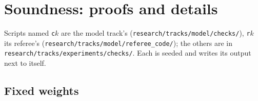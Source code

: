 \section{Soundness: proofs and details}\label{app:sound}

Scripts named \texttt{c}$k$ are the model track's (\nolinkurl{research/tracks/model/checks/}), \texttt{r}$k$ its referee's (\nolinkurl{research/tracks/model/referee_code/}); the others are in \nolinkurl{research/tracks/experiments/checks/}. Each is seeded and writes its output next to itself.

\subsection{Fixed weights}\label{app:sound:fixed}

